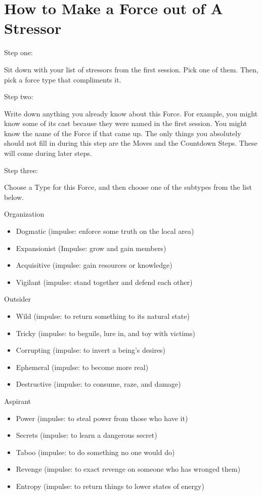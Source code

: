 \documentclass[
  oneside,
  statementpaper,
  9pt]{memoir}
\begin{document}
\hypertarget{how-to-make-a-force-out-of-a-stressor}{%
\section{How to Make a Force out of A
Stressor}\label{how-to-make-a-force-out-of-a-stressor}}

Step one:

Sit down with your list of stressors from the first session. Pick one of
them. Then, pick a force type that compliments it.

Step two:

Write down anything you already know about this Force. For example, you
might know some of its cast because they were named in the first
session. You might know the name of the Force if that came up. The only
things you absolutely should not fill in during this step are the Moves
and the Countdown Steps. These will come during later steps.

Step three:

Choose a Type for this Force, and then choose one of the subtypes from
the list below.

Organization

\begin{itemize}
\item
  Dogmatic (impulse: enforce some truth on the local area)
\item
  Expansionist (Impulse: grow and gain members)
\item
  Acquisitive (impulse: gain resources or knowledge)
\item
  Vigilant (impulse: stand together and defend each other)
\end{itemize}

Outsider

\begin{itemize}
\item
  Wild (impulse: to return something to its natural state)
\item
  Tricky (impulse: to beguile, lure in, and toy with victims)
\item
  Corrupting (impulse: to invert a being's desires)
\item
  Ephemeral (impulse: to become more real)
\item
  Destructive (impulse: to consume, raze, and damage)
\end{itemize}

Aspirant

\begin{itemize}
\item
  Power (impulse: to steal power from those who have it)
\item
  Secrets (impulse: to learn a dangerous secret)
\item
  Taboo (impulse: to do something no one would do)
\item
  Revenge (impulse: to exact revenge on someone who has wronged them)
\item
  Entropy (impulse: to return things to lower states of energy)
\end{itemize}
\end{document}
